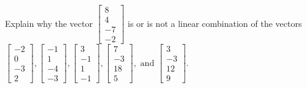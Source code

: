 \documentclass{article}
\begin{document}
\begin{exerciseStatement}
    Explain why the vector \(\left[\begin{array}{c}
8 \\
4 \\
-7 \\
-2
\end{array}\right]\)  is or is not a linear
combination of the vectors \(\left[\begin{array}{c}
-2 \\
0 \\
-3 \\
2
\end{array}\right] , \left[\begin{array}{c}
-1 \\
1 \\
-4 \\
-3
\end{array}\right] , \left[\begin{array}{c}
3 \\
-1 \\
1 \\
-1
\end{array}\right] , \left[\begin{array}{c}
7 \\
-3 \\
18 \\
5
\end{array}\right] , \text{ and } \left[\begin{array}{c}
3 \\
-3 \\
12 \\
9
\end{array}\right]\).



  
\end{exerciseStatement}
\end{document}
